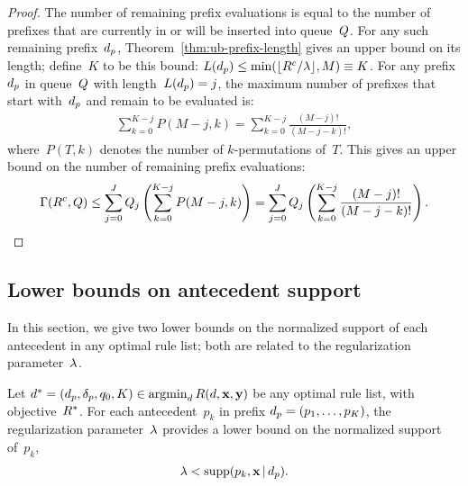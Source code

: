 \begin{arxiv}
\begin{proof}
The number of remaining prefix evaluations is equal to the number of
prefixes that are currently in or will be inserted into queue~$Q$.
%
For any such remaining prefix~$d_p$,
Theorem~\ref{thm:ub-prefix-length} gives an upper bound on its length;
define~$K$ to be this bound:
${L(d_p) \le \min(\lfloor {R^c} / {\lambda} \rfloor, M) \equiv K}$.
%
For any prefix~$d_p$ in queue~$Q$ with length~${L(d_p) = j}$,
the maximum number of prefixes that start with~$d_p$
and remain to be evaluated is:
\begin{align}
\sum_{k=0}^{K-j} P(M-j, k) = \sum_{k=0}^{K-j} \frac{(M-j)!}{(M-j - k)!},
\end{align}
where~${P(T, k)}$ denotes the number of $k$-permutations of~$T$.
%
This gives an upper bound on the number of remaining prefix evaluations:
\begin{align}
\Remaining(\CurrentObj, \Queue)
\le \sum_{j=0}^J \Queue_j \left( \sum_{k=0}^{K-j} P(M-j, k) \right)
= \sum_{j=0}^J \Queue_j \left( \sum_{k=0}^{K-j} \frac{(M-j)!}{(M-j - k)!} \right).
\end{align}
\end{proof}
\end{arxiv}

\subsection{Lower bounds on antecedent support}
\label{sec:lb-support}

In this section, we give two lower bounds on the normalized support
of each antecedent in any optimal rule list;
both are related to the regularization parameter~${\lambda}$.

\begin{theorem}
\label{thm:min-capture}
Let ${d^* = (d_p, \delta_p, q_0, K) \in \operatorname*{argmin}_{d} R({d}, \mathbf{x}, \mathbf{y})}$
be any optimal rule list, with objective~$R^*$.
%
For each antecedent~$p_k$ in prefix ${d_p = (p_1, \dots, p_K)}$,
the regularization parameter~${\lambda}$ provides a lower bound
on the normalized support of~$p_k$,
\begin{align}
\Reg < \Supp(p_k, \x \given \Prefix).
\label{eq:min-capture}
\end{align}
\end{theorem}

